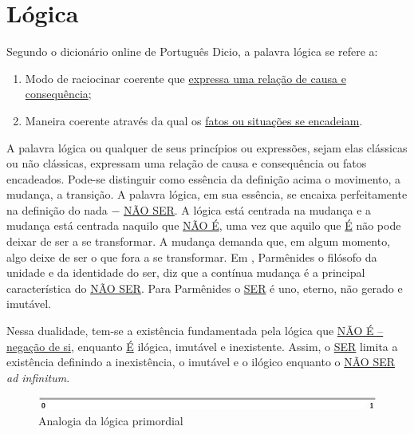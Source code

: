 \section{Lógica}
Segundo o dicionário online de Português Dicio\cite{dicio_logica}, a palavra lógica se refere a:
	\begin{enumerate}
	   \item Modo de raciocinar coerente que \underline{expressa uma relação de causa e consequência};
	   \item Maneira coerente através da qual os \underline{fatos ou situações se encadeiam}. 
	\end{enumerate}
 
\bigbreak
A palavra lógica ou qualquer de seus princípios ou expressões, sejam elas clássicas ou não clássicas, expressam uma relação de causa e consequência ou fatos encadeados. Pode-se distinguir como essência da definição acima o movimento, a mudança, a transição. A palavra lógica, em sua essência, se encaixa perfeitamente na definição do nada − \underline{NÃO SER}. A lógica está centrada na mudança e a mudança está centrada naquilo que \underline{NÃO É}, uma vez que aquilo que \underline{É} não pode deixar de ser a se transformar. A mudança demanda que, em algum momento, algo deixe de ser o que fora a se transformar. Em , Parmênides  o filósofo da unidade e da identidade do ser, diz que a contínua mudança é a principal característica do \underline{NÃO SER}. Para Parmênides o \underline{SER} é uno, eterno, não gerado e imutável.

Nessa dualidade, tem-se a existência fundamentada pela lógica que \underline{NÃO É – negação de si}, enquanto \underline{É} ilógica, imutável e inexistente. Assim, o \underline{SER} limita a existência definindo a inexistência, o imutável e o ilógico enquanto o \underline{NÃO SER} \textit{ad infinitum}.
	\begin{figure}[H]
	\caption{Analogia da lógica primordial}
	\label{fig:primordial_logic_representation}
	\centering
	\includegraphics[scale=.9]{sections/images/primordial_logic_representation.jpg}
	\end{figure}


